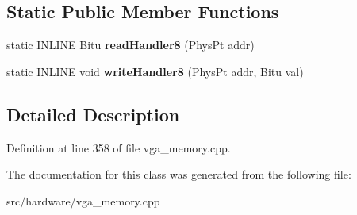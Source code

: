 \subsection*{Static Public Member Functions}
\begin{DoxyCompactItemize}
\item 
\hypertarget{classVGA__ChainedVGA__Slow__Handler_a2c5d68cdb3b70c99d265eea42d938fce}{static I\-N\-L\-I\-N\-E Bitu {\bfseries read\-Handler8} (Phys\-Pt addr)}\label{classVGA__ChainedVGA__Slow__Handler_a2c5d68cdb3b70c99d265eea42d938fce}

\item 
\hypertarget{classVGA__ChainedVGA__Slow__Handler_a26b66b53a5e61455ae92a9c394a6d6b7}{static I\-N\-L\-I\-N\-E void {\bfseries write\-Handler8} (Phys\-Pt addr, Bitu val)}\label{classVGA__ChainedVGA__Slow__Handler_a26b66b53a5e61455ae92a9c394a6d6b7}

\end{DoxyCompactItemize}


\subsection{Detailed Description}


Definition at line 358 of file vga\-\_\-memory.\-cpp.



The documentation for this class was generated from the following file\-:\begin{DoxyCompactItemize}
\item 
src/hardware/vga\-\_\-memory.\-cpp\end{DoxyCompactItemize}
